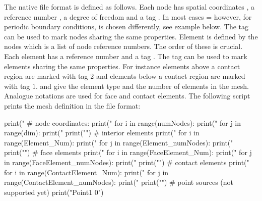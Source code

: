 The native \finley file format is defined as follows.
Each node  has  spatial coordinates , a reference
number , a degree of freedom  and a tag
.
In most cases = however, for periodic
boundary conditions,  is chosen differently, see example below.
The tag can be used to mark nodes sharing the same properties.
Element  is defined by the  nodes
 which is a list of node reference numbers.
The order of these is crucial. Each element has a reference number
 and a tag .
The tag can be used to mark elements sharing the same properties.
For instance elements above a contact region are marked with tag $2$ and
elements below a contact region are marked with tag $1$.
 and  give the element type and the number
of elements in the mesh.
Analogue notations are used for face and contact elements.
The following \PYTHON script prints the mesh definition in the \finley file
format:
\begin{python}
  print("%
  # node coordinates:
  print("%
  for i in range(numNodes):
     print("%
     for j in range(dim): print(" %
     print("\n")
  # interior elements
  print("%
  for i in range(Element_Num):
     print("%
     for j in range(Element_numNodes): print(" %
     print("\n")
  # face elements
  print("%
  for i in range(FaceElement_Num):
     print("%
     for j in range(FaceElement_numNodes): print(" %
     print("\n")
  # contact elements
  print("%
  for i in range(ContactElement_Num):
     print("%
     for j in range(ContactElement_numNodes): 
         print(" %
     print("\n")
  # point sources (not supported yet)
  print("Point1 0")
\end{python}

